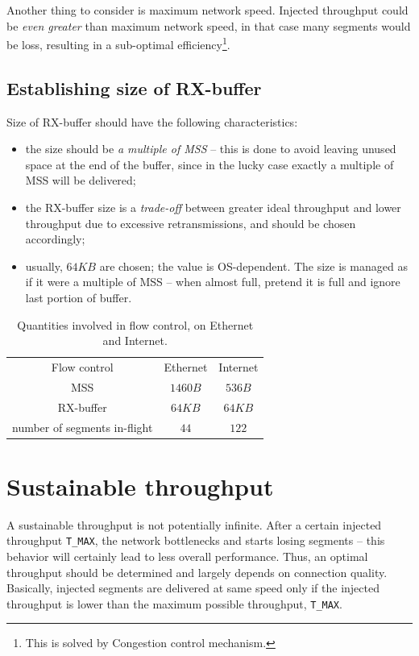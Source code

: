 \documentclass[a4paper, 11pt]{report}
\begin{document}
Another thing to consider is maximum network speed. Injected throughput could
be \emph{even greater} than maximum network speed, in that case many segments
would be loss, resulting in a sub-optimal efficiency\footnote{This is solved by
Congestion control mechanism.}.

\subsection{Establishing size of RX-buffer}

Size of RX-buffer should have the following characteristics:
\begin{itemize}
    \item the size should be \emph{a multiple of MSS} \--- this is done to
        avoid leaving unused space at the end of the buffer, since in the lucky
        case exactly a multiple of MSS will be delivered;
    \item the RX-buffer size is a \emph{trade-off} between greater ideal
        throughput and lower throughput due to excessive retransmissions, and
        should be chosen accordingly;
    \item usually, $64KB$ are chosen; the value is OS-dependent. The size is
        managed as if it were a multiple of MSS \--- when almost full, pretend
        it is full and ignore last portion of buffer.
\end{itemize}

\begin{table}[ht]
\centering
\begin{tabular}{ccc}
    Flow control & Ethernet & Internet \\
    MSS  & $1460B$ & $536B$ \\
    RX-buffer & $64KB$ & $64KB$ \\
    number of segments in-flight & $44$ & $122$
\end{tabular}
\caption{Quantities involved in flow control, on Ethernet and Internet.}\label{tab:FlowControlQuantities}
\end{table}
\bigskip

\section{Sustainable throughput}

A sustainable throughput is not potentially infinite. After a certain injected
throughput \texttt{T\_MAX}, the network bottlenecks and starts losing segments
\--- this behavior will certainly lead to less overall performance. Thus, an
optimal throughput should be determined and largely depends on connection
quality. Basically, injected segments are delivered at same speed only if the
injected throughput is lower than the maximum possible throughput,
\texttt{T\_MAX}.
\end{document}
